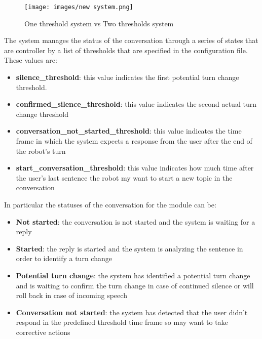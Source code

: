 \documentclass[../main.tex]{subfiles}
\begin{document}
\begin{figure}[ht]
    \centering
    \texttt{[image: images/new system.png]}
    \caption{One threshold system vs Two thresholds system}
    \label{fig:new system}
\end{figure}

The system manages the status of the conversation through a series of states that are controller by a list of thresholds that are specified in the configuration file. These values are:

\begin{itemize}
    \item \textbf{silence\_threshold}: this value indicates the first potential turn change threshold.
    \item \textbf{confirmed\_silence\_threshold}: this value indicates the second actual turn change threshold
    \item \textbf{conversation\_not\_started\_threshold}: this value indicates the time frame in which the system expects a response from the user after the end of the robot's turn
    \item \textbf{start\_conversation\_threshold}: this value indicates how much time after the user's last sentence the robot my want to start a new topic in the conversation
\end{itemize}

In particular the statuses of the conversation for the module can be:

\begin{itemize}
    \item \textbf{Not started}: the conversation is not started and the system is waiting for a reply
    \item \textbf{Started}: the reply is started and the system is analyzing the sentence in order to identify a turn change
    \item \textbf{Potential turn change}: the system has identified a potential turn change and is waiting to confirm the turn change in case of continued silence or will roll back in case of incoming speech
    \item \textbf{Conversation not started}: the system has detected that the user didn't respond in the predefined threshold time frame so may want to take corrective actions
\end{itemize}
\end{document}
